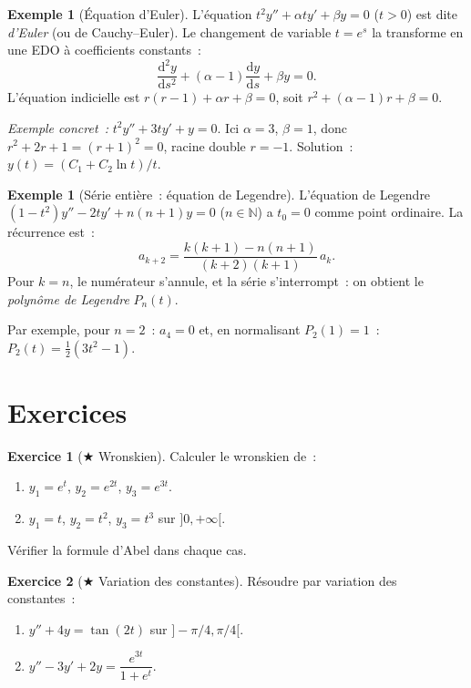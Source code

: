 \documentclass[12pt,a4paper,openany]{book}
\theoremstyle{definition}
\newtheorem{exemple}[definition]{Exemple}
\newtheorem{exercice}{Exercice}[chapter]
\theoremstyle{plain}
\theoremstyle{remark}
\newcommand{\N}{\mathbb{N}}
\newcommand{\dd}{\mathrm{d}}
\begin{document}
\begin{exemple}[Équation d'Euler]\label{ex:euler}
  L'équation $t^2 y'' + \alpha t y' + \beta y = 0$ ($t > 0$) est dite
  \emph{d'Euler} (ou de Cauchy--Euler). Le changement de variable
  $t = e^s$ la transforme en une EDO à coefficients constants~:
  \[
    \frac{\dd^2 y}{\dd s^2} + (\alpha - 1)\frac{\dd y}{\dd s} + \beta y = 0.
  \]
  L'équation indicielle est $r(r-1) + \alpha r + \beta = 0$,
  soit $r^2 + (\alpha-1)r + \beta = 0$.

  \emph{Exemple concret~:} $t^2 y'' + 3ty' + y = 0$. Ici $\alpha=3$,
  $\beta=1$, donc $r^2+2r+1=(r+1)^2=0$, racine double $r=-1$.
  Solution~: $y(t) = (C_1 + C_2 \ln t)/t$.
\end{exemple}

\begin{exemple}[Série entière~: équation de Legendre]\label{ex:legendre}
  L'équation de Legendre $(1-t^2)y'' - 2ty' + n(n+1)y = 0$ ($n \in \N$)
  a $t_0 = 0$ comme point ordinaire. La récurrence est~:
  \[
    a_{k+2} = \frac{k(k+1) - n(n+1)}{(k+2)(k+1)}\,a_k.
  \]
  Pour $k = n$, le numérateur s'annule, et la série s'interrompt~:
  on obtient le \emph{polynôme de Legendre} $P_n(t)$.

  Par exemple, pour $n = 2$~: $a_4 = 0$ et, en normalisant $P_2(1)=1$~:
  $P_2(t) = \frac{1}{2}(3t^2 - 1)$.
\end{exemple}

\section{Exercices}\label{sec:exo-ch6}

\begin{exercice}[$\bigstar$ Wronskien]\label{exo:wronskien-calcul}
  Calculer le wronskien de~:
  \begin{enumerate}[label=\alph*)]
    \item $y_1 = e^t$, $y_2 = e^{2t}$, $y_3 = e^{3t}$.
    \item $y_1 = t$, $y_2 = t^2$, $y_3 = t^3$ sur $]0,+\infty[$.
  \end{enumerate}
  Vérifier la formule d'Abel dans chaque cas.
\end{exercice}

\begin{exercice}[$\bigstar$ Variation des constantes]\label{exo:var-cst-1}
  Résoudre par variation des constantes~:
  \begin{enumerate}[label=\alph*)]
    \item $y'' + 4y = \tan(2t)$ sur $]-\pi/4, \pi/4[$.
    \item $y'' - 3y' + 2y = \dfrac{e^{3t}}{1+e^t}$.
  \end{enumerate}
\end{exercice}
\end{document}
